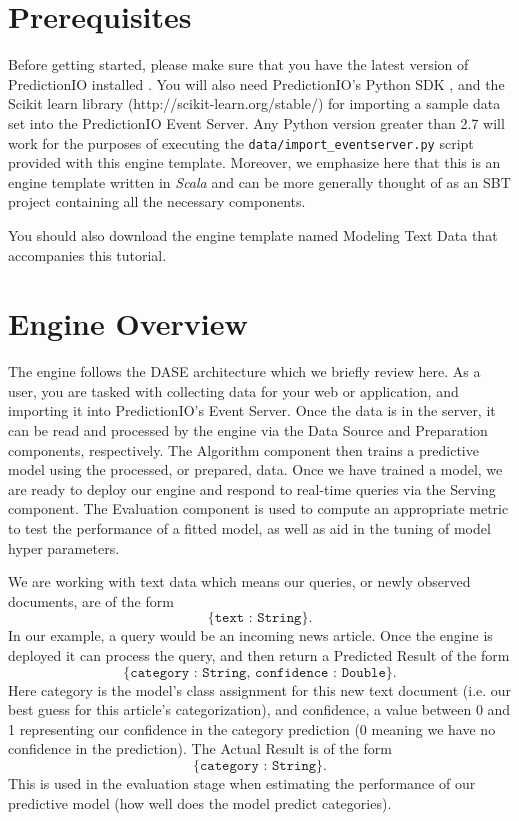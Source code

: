 \documentclass[a4paper,12pt]{article}
\renewcommand{\it}[1]{\textit{#1}}
\renewcommand{\tt}[1]{\texttt{#1}}
\newcommand{\3}{\left}
\newcommand{\4}{\right}
\renewcommand{\-}[1]{{}^{-#1}}
\begin{document}
\section*{Prerequisites}

Before getting started, please make sure that you have the latest version of PredictionIO installed 
. You will also need PredictionIO's Python SDK 
, and the Scikit learn library (http://scikit-learn.org/stable/) for importing a sample data set into the PredictionIO Event Server. Any Python version greater than 2.7 will work for the purposes of executing the \tt{data/import\_eventserver.py} script provided with this engine template. Moreover, we emphasize here that this is an engine template written in \it{Scala} and can be more generally thought of as an SBT project containing all the necessary components.

You should also download the engine template named Modeling Text Data 
 that accompanies this tutorial.

\section*{Engine Overview}

The engine follows the DASE architecture which we briefly review here. As a user, you are tasked with collecting data for your web or application, and importing it into PredictionIO's Event Server. Once the data is in the server, it  can be read and processed by the engine via the Data Source and Preparation components, respectively. The Algorithm component then trains a predictive model using the processed, or prepared, data. Once we have trained a model, we are ready to deploy our engine and respond to real-time queries via the Serving component. The Evaluation component is used to compute an appropriate metric to test the performance of a fitted model, as well as aid in the tuning of model hyper parameters. 

We are working with text data which means our queries, or newly observed documents, are of the form 
$$
\tt{\{text : String\}}.
$$
In our example, a query would be an incoming news article. Once the engine is deployed it can process the query, and then return a Predicted Result of the form 
$$
\tt{\{category : String, confidence : Double\}}.
$$
Here category is the model's class assignment for this new text document (i.e. our best guess for this article's categorization), and confidence, a value between 0 and 1 representing our confidence in the category prediction (0 meaning we have no confidence in the prediction). The Actual Result is of the form 
$$
\tt{\{category : String\}}.
$$
This is used in the evaluation stage when estimating the performance of our predictive model (how well does the model predict categories). 
 
\end{document}
